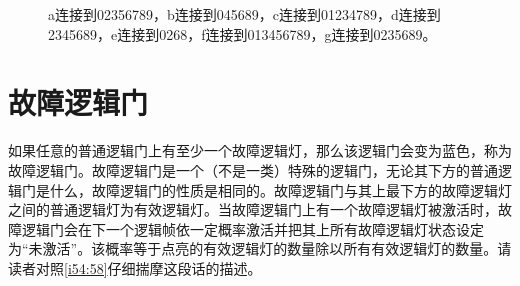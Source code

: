 \begin{figure}[!h]
\begin{center}
\subfloat{}
\end{center}
\caption{a连接到02356789，b连接到045689，c连接到01234789，d连接到2345689，e连接到0268，f连接到013456789，g连接到0235689。}
\label{i42:43}
\end{figure}

\section{故障逻辑门}

如果任意的普通逻辑门上有至少一个故障逻辑灯，那么该逻辑门会变为蓝色，称为故障逻辑门。故障逻辑门是一个（不是一类）特殊的逻辑门，无论其下方的普通逻辑门是什么，故障逻辑门的性质是相同的。故障逻辑门与其上最下方的故障逻辑灯之间的普通逻辑灯为有效逻辑灯。当故障逻辑门上有一个故障逻辑灯被激活时，故障逻辑门会在下一个逻辑帧依一定概率激活并把其上所有故障逻辑灯状态设定为“未激活”。该概率等于点亮的有效逻辑灯的数量除以所有有效逻辑灯的数量。请读者对照\autoref{i54:58}仔细揣摩这段话的描述。

